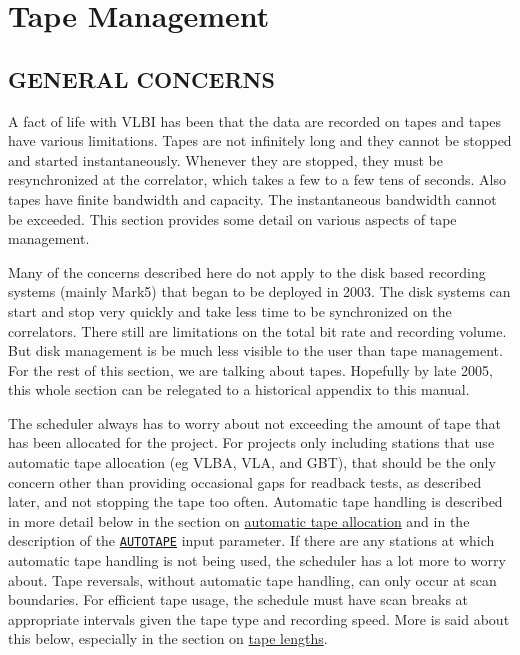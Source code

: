 \documentclass{report}
\begin{document}
\section{\label{SSEC:TAPEMANAGEMENT}Tape Management}

\subsection{\label{SSSEC:TAPEGEN}GENERAL CONCERNS}

A fact of life with VLBI has been that the data are recorded on tapes
and tapes have various limitations.  Tapes are not infinitely long and
they cannot be stopped and started instantaneously.  Whenever they are
stopped, they must be resynchronized at the correlator, which takes a
few to a few tens of seconds.  Also tapes have finite bandwidth and
capacity.  The instantaneous bandwidth cannot be exceeded.  This
section provides some detail on various aspects of tape management.

Many of the concerns described here do not apply to the disk based
recording systems (mainly Mark5) that began to be deployed in 2003.
The disk systems can start and stop very quickly and take less time to
be synchronized on the correlators.  There still are limitations on
the total bit rate and recording volume.  But disk management is be
much less visible to the user than tape management.  For the rest of
this section, we are talking about tapes.  Hopefully by late 2005,
this whole section can be relegated to a historical appendix to this
manual.

The scheduler always has to worry about not exceeding the amount of
tape that has been allocated for the project.  For projects only
including stations that use automatic tape allocation (eg VLBA, VLA,
and GBT), that should be the only concern other than providing
occasional gaps for readback tests, as described later, and not
stopping the tape too often.  Automatic tape handling is described in
more detail below in the section on 
{\hyperref[SSSEC:AUTOTAPE]{automatic tape allocation}}
and in the description of the
{\hyperref[MP:AUTOTAPE]{{\tt AUTOTAPE}}} input parameter.  If there are
any stations at which automatic tape handling is not being used, the
scheduler has a lot more to worry about.  Tape reversals, without
automatic tape handling, can only occur at scan boundaries.  For
efficient tape usage, the schedule must have scan breaks at
appropriate intervals given the tape type and recording speed.  More
is said about this below, especially in the section on 
{\hyperref[SSSEC:TAPELEN]{tape lengths}}.
\end{document}
